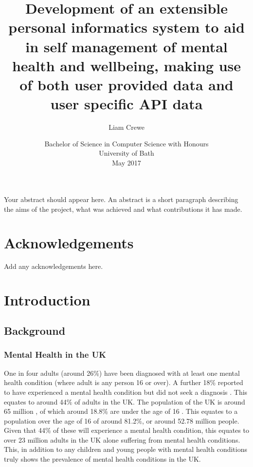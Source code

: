 \documentclass[11pt,openright,a4paper]{report}
\title{Development of an extensible personal informatics system to aid in self management of mental health and wellbeing, making use of both user provided data and user specific API data}
\author{Liam Crewe}
\date{Bachelor of Science in Computer Science with Honours\\University of Bath\\May 2017}
\begin{document}
\lstset{language=Java,breaklines,breakatwhitespace,basicstyle=\small}

\setcounter{page}{0}

\maketitle
\newpage


\newpage


\newpage


\abstract
Your abstract should appear here.  An abstract is a short
paragraph describing the aims of the project, what was
achieved and what contributions it has made.
\newpage


\tableofcontents
\newpage
\listoffigures
\newpage
\listoftables
\newpage


\chapter*{Acknowledgements}
Add any acknowledgements here.
\newpage


\setcounter{page}{1}

\chapter{Introduction}
\section{Background}
\subsection{Mental Health in the UK}
One in four adults (around 26\%) have been diagnosed with at least one mental health condition \parencite{hse2014} (where adult is any person 16 or over). A further 18\% reported to have experienced a mental health condition but did not seek a diagnosis \parencite{hse2014}. This equates to around 44\% of adults in the UK. The population of the UK is around 65 million \parencite{onspopulation}, of which around 18.8\% are under the age of 16 \parencite{onspopulation}. This equates to a population over the age of 16 of around 81.2\%, or around 52.78 million people. Given that 44\% of these will experience a mental health condition, this equates to over 23 million adults in the UK alone suffering from mental health conditions. This, in addition to any children and young people with mental health conditions truly shows the prevalence of mental health conditions in the UK.
\end{document}
